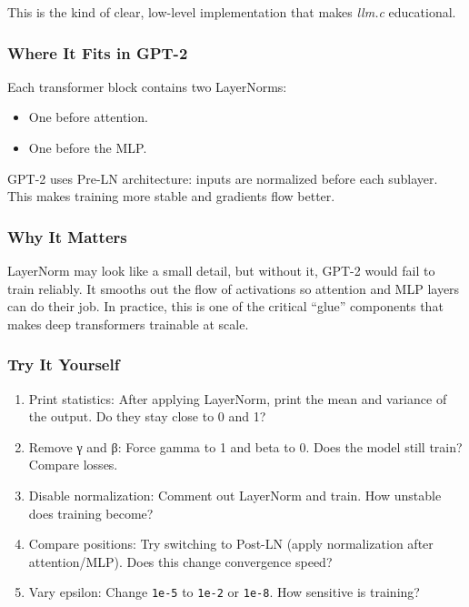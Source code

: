 \documentclass[
  letterpaper,
  DIV=11,
  numbers=noendperiod]{scrreprt}
\providecommand{\tightlist}{%
  \setlength{\itemsep}{0pt}\setlength{\parskip}{0pt}}
\begin{document}
This is the kind of clear, low-level implementation that makes
\emph{llm.c} educational.

\subsubsection{Where It Fits in GPT-2}\label{where-it-fits-in-gpt-2}

Each transformer block contains two LayerNorms:

\begin{itemize}
\tightlist
\item
  One before attention.
\item
  One before the MLP.
\end{itemize}

GPT-2 uses Pre-LN architecture: inputs are normalized before each
sublayer. This makes training more stable and gradients flow better.

\subsubsection{Why It Matters}\label{why-it-matters-13}

LayerNorm may look like a small detail, but without it, GPT-2 would fail
to train reliably. It smooths out the flow of activations so attention
and MLP layers can do their job. In practice, this is one of the
critical ``glue'' components that makes deep transformers trainable at
scale.

\subsubsection{Try It Yourself}\label{try-it-yourself-15}

\begin{enumerate}
\def\labelenumi{\arabic{enumi}.}
\tightlist
\item
  Print statistics: After applying LayerNorm, print the mean and
  variance of the output. Do they stay close to 0 and 1?
\item
  Remove γ and β: Force gamma to 1 and beta to 0. Does the model still
  train? Compare losses.
\item
  Disable normalization: Comment out LayerNorm and train. How unstable
  does training become?
\item
  Compare positions: Try switching to Post-LN (apply normalization after
  attention/MLP). Does this change convergence speed?
\item
  Vary epsilon: Change \texttt{1e-5} to \texttt{1e-2} or \texttt{1e-8}.
  How sensitive is training?
\end{enumerate}
\end{document}

